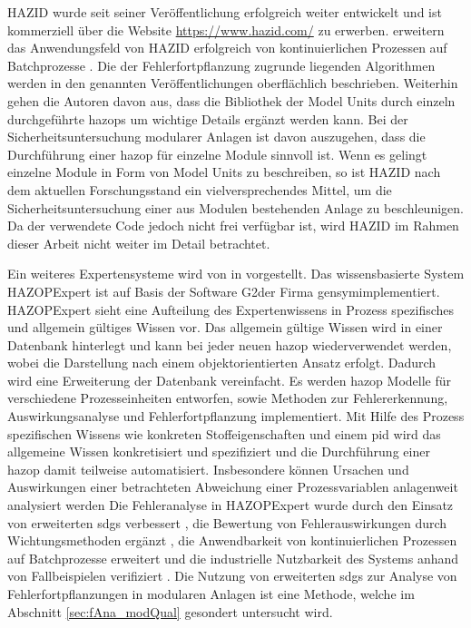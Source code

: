 HAZID wurde seit seiner Ver\"offentlichung erfolgreich weiter entwickelt und ist kommerziell \"uber die Website \url{https://www.hazid.com/} zu erwerben. \citeauthor{Palmer_2009} erweitern das Anwendungsfeld von HAZID erfolgreich von kontinuierlichen Prozessen auf Batchprozesse \cite{Palmer_2009}. \newline
Die der Fehlerfortpflanzung zugrunde liegenden Algorithmen werden in den genannten Ver\"offentlichungen oberfl\"achlich beschrieben. Weiterhin gehen die Autoren davon aus, dass die Bibliothek der Model Units durch einzeln durchgef\"uhrte \acp{hazop} um wichtige Details erg\"anzt werden kann. Bei der Sicherheitsuntersuchung modularer Anlagen ist davon auszugehen, dass die Durchf\"uhrung einer \ac{hazop} f\"ur einzelne Module sinnvoll ist. Wenn es gelingt einzelne Module in Form von Model Units zu beschreiben, so ist HAZID nach dem aktuellen Forschungsstand ein vielversprechendes Mittel, um die Sicherheitsuntersuchung einer aus Modulen bestehenden Anlage zu beschleunigen. Da der verwendete Code jedoch nicht frei verf\"ugbar ist, wird HAZID im Rahmen dieser Arbeit nicht weiter im Detail betrachtet. \newline

Ein weiteres Expertensysteme wird von \citeauthor{Venkatasubramanian1994} in  \cite{Venkatasubramanian1994} vorgestellt. Das wissensbasierte System HAZOPExpert ist auf Basis der Software \glqq G2\grqq { }der Firma \glqq gensym\grqq { }implementiert. HAZOPExpert sieht eine Aufteilung des Expertenwissens in Prozess spezifisches und allgemein g\"ultiges Wissen vor. Das allgemein g\"ultige Wissen wird in einer Datenbank hinterlegt und kann bei jeder neuen \ac{hazop} wiederverwendet werden, wobei die Darstellung nach einem objektorientierten Ansatz erfolgt. Dadurch wird eine Erweiterung der Datenbank vereinfacht. Es werden \ac{hazop} Modelle f\"ur verschiedene Prozesseinheiten entworfen, sowie Methoden zur Fehlererkennung,  Auswirkungsanalyse und Fehlerfortpflanzung implementiert. Mit Hilfe des Prozess spezifischen Wissens wie konkreten Stoffeigenschaften und einem \ac{pid} wird das allgemeine Wissen konkretisiert und spezifiziert und die Durchf\"uhrung einer \ac{hazop} damit teilweise automatisiert. Insbesondere k\"onnen Ursachen und Auswirkungen einer betrachteten Abweichung einer Prozessvariablen anlagenweit analysiert werden  \newline
Die Fehleranalyse in HAZOPExpert wurde durch den Einsatz von erweiterten \acp{sdg} verbessert \cite{Vaidhyanathan_1995}, die Bewertung von Fehlerauswirkungen durch Wichtungsmethoden erg\"anzt \cite{Vaidhyanathan_1996}, die Anwendbarkeit von kontinuierlichen Prozessen auf Batchprozesse erweitert \cite{Venkatasubramanian_2000} und die industrielle Nutzbarkeit des Systems anhand von Fallbeispielen verifiziert \cite{Venkatasubramanian1994,Vaidhyanathan1996,Venkatasubramanian_2000}. Die Nutzung von erweiterten \acp{sdg} zur Analyse von Fehlerfortpflanzungen in modularen Anlagen ist eine Methode, welche im Abschnitt \ref{sec:fAna_modQual} gesondert untersucht wird.


